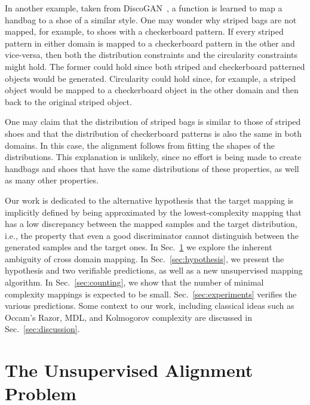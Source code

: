 \documentclass{article} %
\begin{document}
In another example, taken from DiscoGAN~\citep{discogan}, a function is learned to map a handbag to a shoe of a similar style. One may wonder why striped bags are not mapped, for example, to shoes with a checkerboard pattern. If every striped pattern in either domain is mapped to a checkerboard pattern in the other and vice-versa, then both the distribution constraints and the circularity constraints might hold. The former could hold since both striped and checkerboard patterned objects would be generated. Circularity could hold since, for example, a striped object would be mapped to a checkerboard object in the other domain and then back to the original striped object.

One may claim that the distribution of striped bags is similar to those of striped shoes and that the distribution of checkerboard patterns is also the same in both domains. In this case, the alignment follows from fitting the shapes of the distributions. This explanation is unlikely, since no effort is being made to create handbags and shoes that have the same distributions of these properties, as well as many other properties.

 

Our work is dedicated to the alternative hypothesis that the target mapping is implicitly defined by being approximated by the lowest-complexity mapping that has a low discrepancy between the mapped samples and the target distribution, i.e., the property that even a good discriminator cannot distinguish between the generated samples and the target ones. In Sec.~\ref{sec:problemformulation} we explore the inherent ambiguity of cross domain mapping. In Sec.~\ref{sec:hypothesis}, we present the hypothesis and two verifiable predictions, as well as a new unsupervised mapping algorithm. In Sec.~\ref{sec:counting}, we show that the number of minimal complexity mappings is expected to be small. Sec.~\ref{sec:experiments} verifies the various predictions. Some context to our work, including classical ideas such as Occam's Razor, MDL, and Kolmogorov complexity are discussed in Sec.~\ref{sec:discussion}.

 

\section{The Unsupervised Alignment Problem}

\label{sec:problemformulation}
\end{document}
